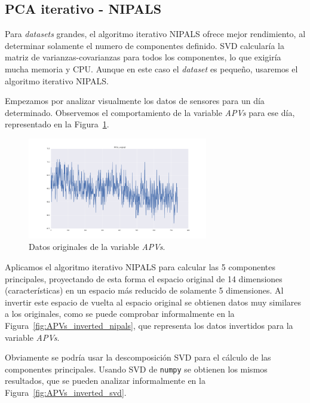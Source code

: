 \documentclass[11pt,spanish,listoffigures,listoftables]{tfgetsinf}
\begin{document}
    \subsection{PCA iterativo - NIPALS}
    Para {\em datasets} grandes, el algoritmo iterativo NIPALS ofrece mejor rendimiento, al determinar solamente el numero de componentes definido. SVD calcularía la matriz de varianzas-covarianzas para todos los componentes, lo que exigiría mucha memoria y CPU. Aunque en este caso el {\em dataset} es pequeño, usaremos el algoritmo iterativo NIPALS.
    
    Empezamos por analizar visualmente los datos de sensores para un día determinado. Observemos el comportamiento de la variable {\em APVs} para ese día, representado en la Figura~\ref{fig:APVs_original}. 
    
    \begin{figure}[h]
        \centering
        \includegraphics[width=0.7\textwidth]{APVs_original.png}
        \caption{Datos originales de la variable {\em APVs}.}
        \label{fig:APVs_original}
    \end{figure}
    
    Aplicamos el algoritmo iterativo NIPALS para calcular las 5 componentes principales, proyectando de esta forma el espacio original de 14 dimensiones (características) en un espacio más reducido de solamente 5 dimensiones. Al invertir este espacio de vuelta al espacio original se obtienen datos muy similares a los originales, como se puede comprobar informalmente en la Figura~\ref{fig:APVs_inverted_nipals}, que representa los datos invertidos para la variable {\em APVs}.
    
    Obviamente se podría usar la descomposición SVD para el cálculo de las componentes principales. Usando SVD de {\tt numpy} se obtienen los mismos resultados, que se pueden analizar informalmente en la Figura~\ref{fig:APVs_inverted_svd}. 
    
\end{document}
